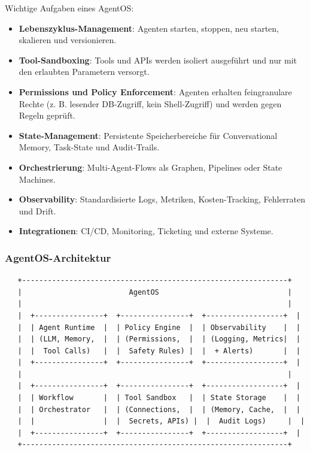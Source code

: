 Wichtige Aufgaben eines AgentOS:

\begin{itemize}[leftmargin=*]
    \item \textbf{Lebenszyklus-Management}: Agenten starten, stoppen, neu starten, skalieren und versionieren.
    \item \textbf{Tool-Sandboxing}: Tools und APIs werden isoliert ausgeführt und nur mit den erlaubten Parametern versorgt.
    \item \textbf{Permissions und Policy Enforcement}: Agenten erhalten feingranulare Rechte (z. B. lesender DB-Zugriff, kein Shell-Zugriff) und werden gegen Regeln geprüft.
    \item \textbf{State-Management}: Persistente Speicherbereiche für Conversational Memory, Task-State und Audit-Trails.
    \item \textbf{Orchestrierung}: Multi-Agent-Flows als Graphen, Pipelines oder State Machines.
    \item \textbf{Observability}: Standardisierte Logs, Metriken, Kosten-Tracking, Fehlerraten und Drift.
    \item \textbf{Integrationen}: CI/CD, Monitoring, Ticketing und externe Systeme.
\end{itemize}

\subsubsection{AgentOS-Architektur}

\begin{verbatim}
   +--------------------------------------------------------------+
   |                         AgentOS                              |
   |                                                              |
   |  +----------------+  +----------------+  +------------------+  |
   |  | Agent Runtime  |  | Policy Engine  |  | Observability    |  |
   |  | (LLM, Memory,  |  | (Permissions,  |  | (Logging, Metrics|  |
   |  |  Tool Calls)   |  |  Safety Rules) |  |  + Alerts)       |  |
   |  +----------------+  +----------------+  +------------------+  |
   |                                                              |
   |  +----------------+  +----------------+  +------------------+  |
   |  | Workflow       |  | Tool Sandbox   |  | State Storage    |  |
   |  | Orchestrator   |  | (Connections,  |  | (Memory, Cache,  |  |
   |  |                |  |  Secrets, APIs) |  |  Audit Logs)     |  |
   |  +----------------+  +----------------+  +------------------+  |
   +--------------------------------------------------------------+
\end{verbatim}

